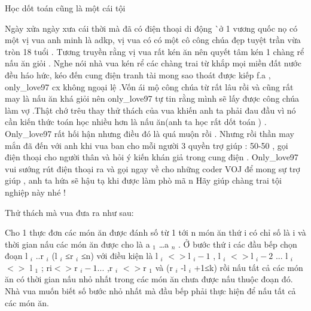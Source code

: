 Học dốt toán cũng là một cái tội  



   Ngày xửa ngày xưa cái thời mà đã có điện thoại di động ^^ ở 1 vương quốc nọ có một vị vua anh minh là adkp, vị vua có có một cô công chúa đẹp tuyệt trần vừa tròn 18 tuổi . Tương truyền rằng vị vua rất kén ăn nên quyết tâm kén 1 chàng rể nấu ăn giỏi . Nghe nói nhà vua kén rể các chàng trai từ khắp mọi miền đất nước đều háo hức, kéo đến cung điện tranh tài mong sao thoát được kiếp f.a , only\_love97 cx không ngoại lệ .Vốn ái mộ công chúa từ rất lâu rồi và cũng rất may là nấu ăn khá giỏi nên only\_love97 tự tin rằng mình sẽ lấy được công chúa làm vợ .Thật chớ trêu thay thử thách của vua khiến anh ta phải đau đầu vì nó cần kiến thức toán học nhiều hơn là nấu ăn(anh ta học rất dốt toán ) . Only\_love97 rất hối hận nhưng điều đó là quá muộn rồi . Nhưng rồi thần may mắn đã đến với anh khi vua ban cho mỗi người 3 quyền trợ giúp : 50-50 , gọi điện thoại cho người thân và hỏi ý kiến khán giả trong cung điện . Only\_love97 vui sướng rút điện thoại ra và gọi ngay về cho những coder VOJ để mong sự trợ giúp , anh ta hứa sẽ hậu tạ khi được làm phò mã ^^. Hãy giúp chàng trai tội nghiệp này nhé !  

   Thử thách mà vua đưa ra như sau:  

   Cho 1 thực đơn các món ăn được đánh số từ 1 tới n món ăn thứ i có chỉ số là i và thời gian nấu các món ăn được cho là a   $_    1   $   …a   $_    n   $   . Ở bước thứ i các đầu bếp chọn đoạn l   $_    i   $   ..r   $_    i   $   (l   $_    i   $   ≤r   $_    i   $   ≤n) với điều kiện là l   $_    i   $   $<$$>$l   $_    i-1   $   , l   $_    i   $   $<$$>$l   $_    i-2   $   ... l   $_    i   $   $<$$>$ l   $_    1   $   ; ri$<$$>$r   $_    i-1...   $   ,r   $_    i   $   $<$$>$r   $_    1   $   và (r   $_    i   $   -l   $_    i   $   +1≤k) rồi nấu tất cả các món ăn có thời gian nấu nhỏ nhất trong các món ăn chưa được nấu thuộc đoạn đó. Nhà vua muốn biết số bước nhỏ nhất mà đầu bếp phải thực hiện để nấu tất cả các món ăn.